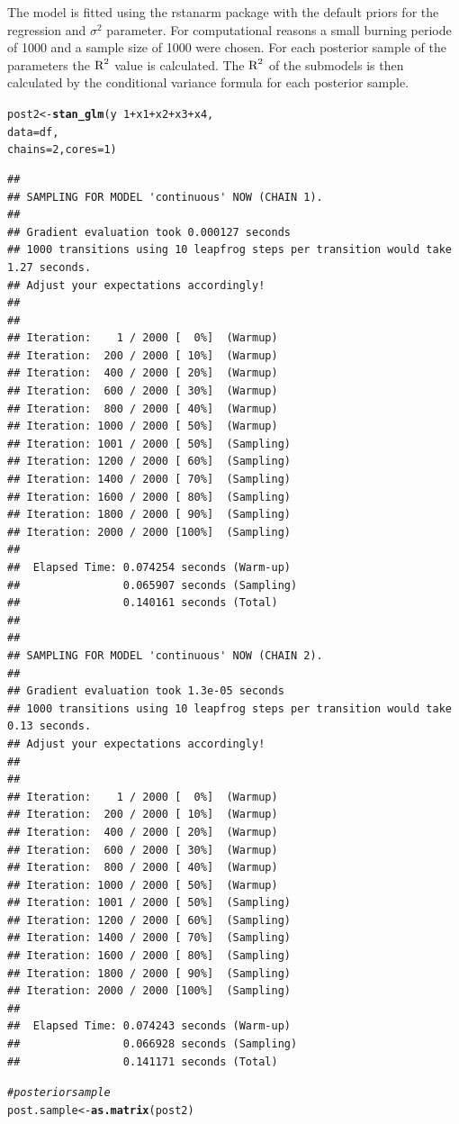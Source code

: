 \documentclass[11pt,a4paper,twoside]{book}
\makeatletter
\newcommand{\hlnum}[1]{\textcolor[rgb]{0.686,0.059,0.569}{#1}}%
\newcommand{\hlcom}[1]{\textcolor[rgb]{0.678,0.584,0.686}{\textit{#1}}}%
\newcommand{\hlopt}[1]{\textcolor[rgb]{0,0,0}{#1}}%
\newcommand{\hlstd}[1]{\textcolor[rgb]{0.345,0.345,0.345}{#1}}%
\newcommand{\hlkwb}[1]{\textcolor[rgb]{0.69,0.353,0.396}{#1}}%
\newcommand{\hlkwc}[1]{\textcolor[rgb]{0.333,0.667,0.333}{#1}}%
\newcommand{\hlkwd}[1]{\textcolor[rgb]{0.737,0.353,0.396}{\textbf{#1}}}%
\newenvironment{kframe}{%
 \def\at@end@of@kframe{}%
 \ifinner\ifhmode%
  \def\at@end@of@kframe{\end{minipage}}%
  \begin{minipage}{\columnwidth}%
 \fi\fi%
 \def\FrameCommand##1{\hskip\@totalleftmargin \hskip-\fboxsep
 \colorbox{shadecolor}{##1}\hskip-\fboxsep
     \hskip-\linewidth \hskip-\@totalleftmargin \hskip\columnwidth}%
 \MakeFramed {\advance\hsize-\width
   \@totalleftmargin\z@ \linewidth\hsize
   \@setminipage}}%
 {\par\unskip\endMakeFramed%
 \at@end@of@kframe}
\newenvironment{knitrout}{}{} %
\makeatother
\begin{document}
The model is fitted using the rstanarm package with the default priors for the regression and $\sigma^2$ parameter. For computational reasons a small burning periode of 1000 and a sample size of 1000 were chosen. For each posterior sample of the parameters the $\text{R}^2$ value is calculated. The $\text{R}^2$ of the submodels is then calculated by the conditional variance formula for each posterior sample.


\begin{knitrout}
\color{fgcolor}\begin{kframe}
\begin{alltt}
\hlstd{post2} \hlkwb{<-} \hlkwd{stan_glm}\hlstd{(y} \hlopt{~} \hlnum{1} \hlopt{+} \hlstd{x1} \hlopt{+} \hlstd{x2} \hlopt{+} \hlstd{x3} \hlopt{+} \hlstd{x4,}
                  \hlkwc{data} \hlstd{= df,}
                  \hlkwc{chains} \hlstd{=} \hlnum{2}\hlstd{,} \hlkwc{cores} \hlstd{=} \hlnum{1}\hlstd{)}
\end{alltt}
\begin{verbatim}
## 
## SAMPLING FOR MODEL 'continuous' NOW (CHAIN 1).
## 
## Gradient evaluation took 0.000127 seconds
## 1000 transitions using 10 leapfrog steps per transition would take 1.27 seconds.
## Adjust your expectations accordingly!
## 
## 
## Iteration:    1 / 2000 [  0%]  (Warmup)
## Iteration:  200 / 2000 [ 10%]  (Warmup)
## Iteration:  400 / 2000 [ 20%]  (Warmup)
## Iteration:  600 / 2000 [ 30%]  (Warmup)
## Iteration:  800 / 2000 [ 40%]  (Warmup)
## Iteration: 1000 / 2000 [ 50%]  (Warmup)
## Iteration: 1001 / 2000 [ 50%]  (Sampling)
## Iteration: 1200 / 2000 [ 60%]  (Sampling)
## Iteration: 1400 / 2000 [ 70%]  (Sampling)
## Iteration: 1600 / 2000 [ 80%]  (Sampling)
## Iteration: 1800 / 2000 [ 90%]  (Sampling)
## Iteration: 2000 / 2000 [100%]  (Sampling)
## 
##  Elapsed Time: 0.074254 seconds (Warm-up)
##                0.065907 seconds (Sampling)
##                0.140161 seconds (Total)
## 
## 
## SAMPLING FOR MODEL 'continuous' NOW (CHAIN 2).
## 
## Gradient evaluation took 1.3e-05 seconds
## 1000 transitions using 10 leapfrog steps per transition would take 0.13 seconds.
## Adjust your expectations accordingly!
## 
## 
## Iteration:    1 / 2000 [  0%]  (Warmup)
## Iteration:  200 / 2000 [ 10%]  (Warmup)
## Iteration:  400 / 2000 [ 20%]  (Warmup)
## Iteration:  600 / 2000 [ 30%]  (Warmup)
## Iteration:  800 / 2000 [ 40%]  (Warmup)
## Iteration: 1000 / 2000 [ 50%]  (Warmup)
## Iteration: 1001 / 2000 [ 50%]  (Sampling)
## Iteration: 1200 / 2000 [ 60%]  (Sampling)
## Iteration: 1400 / 2000 [ 70%]  (Sampling)
## Iteration: 1600 / 2000 [ 80%]  (Sampling)
## Iteration: 1800 / 2000 [ 90%]  (Sampling)
## Iteration: 2000 / 2000 [100%]  (Sampling)
## 
##  Elapsed Time: 0.074243 seconds (Warm-up)
##                0.066928 seconds (Sampling)
##                0.141171 seconds (Total)
\end{verbatim}
\begin{alltt}
\hlcom{#posterior sample}
\hlstd{post.sample} \hlkwb{<-} \hlkwd{as.matrix}\hlstd{(post2)}


\end{alltt}
\end{kframe}
\end{knitrout}
\end{document}
